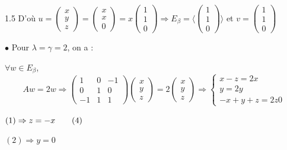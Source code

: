 \documentclass[12pt]{article}
\begin{document}
\begin{spacing}{1.5}
D'où $u=\begin{pmatrix}
x\\
y\\
z
\end{pmatrix}=\begin{pmatrix}
x\\
x\\
0
\end{pmatrix}=x\begin{pmatrix}
1\\
1\\
0
\end{pmatrix}\Rightarrow E_\beta=\langle \begin{pmatrix}
1\\
1\\
0
\end{pmatrix}\rangle$ et $v=\begin{pmatrix}
1\\
1\\
0
\end{pmatrix}$

$\bullet$ Pour $\lambda=\gamma=2$, on a :

$\forall w\in E_\beta$, \[Aw=2w\Rightarrow \begin{pmatrix}
1 & 0 & -1\\
0 & 1 & 0\\
-1 & 1 & 1
\end{pmatrix}\begin{pmatrix}
x\\
y\\
z
\end{pmatrix}=2\begin{pmatrix}
x\\
y\\
z
\end{pmatrix}\Rightarrow \begin{cases}
x-z=2x\\
y=2y\\
-x+y+z=2z0
\end{cases}\]

$(1)\Rightarrow z=-x \hspace{0.7cm} (4)$

$(2)\Rightarrow y=0$


\end{spacing}
\end{document}
